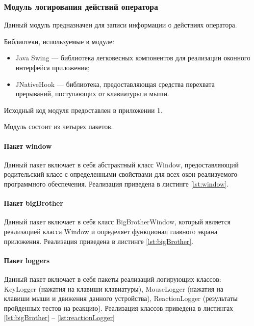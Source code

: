 \subsubsection{Модуль логирования действий оператора}
Данный модуль предназначен для записи информации о действиях оператора.

Библиотеки, используемые в модуле:

\begin{itemize}[leftmargin=1.6\parindent]
\item Java Swing \cite{swing} --- библиотека легковесных компонентов для реализации оконного интерфейса приложения;
\item JNativeHook \cite{jnativehook} --- библиотека, предоставляющая средства перехвата прерываний, поступающих от клавиатуры и мыши.
\end{itemize}

Исходный код модуля предоставлен в приложении 1.

Модуль состоит из четырех пакетов.

\paragraph{Пакет window \newline}
Данный пакет включает в себя абстрактный класс Window, предоставляющий родительский класс с определенными свойствами для всех окон реализуемого программного обеспечения. Реализация приведена в листинге \ref{lst:window}.



\paragraph{Пакет bigBrother \newline}
Данный пакет включает в себя класс BigBrotherWindow, который является реализацией класса Window и определяет функционал главного экрана приложения. Реализация приведена в листинге \ref{lst:bigBrother}.



\paragraph{Пакет loggers \newline}
Данный пакет включает в себя пакеты реализаций логирующих классов: KeyLogger (нажатия на клавиши клавиатуры), MouseLogger (нажатия на клавиши мыши и движения данного устройства), ReactionLogger (результаты пройденных тестов на реакцию). Реализация классов приведена в листингах \ref{lst:bigBrother} -- \ref{lst:reactionLogger}

